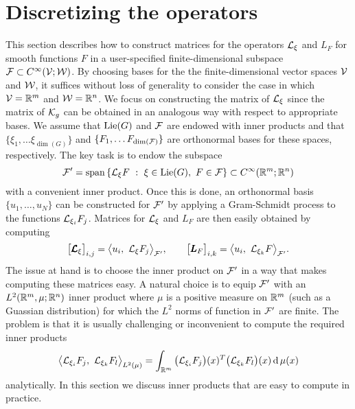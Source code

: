 \documentclass[twoside,11pt]{article}
\begin{document}
\section{Discretizing the operators}
\label{sec:discretization}
This section describes how to construct matrices for the operators ${\mathcal{L}}_\xi$ and $L_F$ for smooth functions $F$ in a user-specified finite-dimensional subspace ${\mathcal{F}} \subset C^{\infty}({\mathcal{V}};{\mathcal{W}})$.
By choosing bases for the the finite-dimensional vector spaces ${\mathcal{V}}$ and ${\mathcal{W}}$, it suffices without loss of generality to consider the case in which ${\mathcal{V}} = \mathbb{R}^m$ and ${\mathcal{W}} = \mathbb{R}^n$.
We focus on constructing the matrix of ${\mathcal{L}}_\xi$ since the matrix of ${\mathcal{K}}_g$ can be obtained in an analogous way with respect to appropriate bases.
We assume that $\operatorname{Lie}(G)$ and ${\mathcal{F}}$ are endowed with inner products and that $\{ \xi_1, \ldots \xi_{\dim(G)} \}$ and $\{ F_1, \ldots F_{\dim({\mathcal{F}})} \}$ are orthonormal bases for these spaces, respectively.
The key task is to endow the subspace
\begin{equation}
    {\mathcal{F}}' = \operatorname{span} \left\{ {\mathcal{L}}_\xi F \ : \ \xi\in\operatorname{Lie}(G),\ F\in{\mathcal{F}} \right\} \subset C^{\infty}(\mathbb{R}^m;\mathbb{R}^n)
\end{equation}
with a convenient inner product.
Once this is done, an orthonormal basis $\{ u_1, \ldots, u_N \}$ can be constructed for ${\mathcal{F}}'$ by applying a Gram-Schmidt process to the functions ${\mathcal{L}}_{\xi_i} F_j$.
Matrices for ${\mathcal{L}}_\xi$ and $L_F$ are then easily obtained by computing
\begin{equation}
    \big[ {\pmb{{\mathcal{L}}}}_\xi \big]_{i,j} = \big\langle u_i, \ {\mathcal{L}}_\xi F_j \big\rangle_{{\mathcal{F}}'}, \qquad
    \big[ {\pmb{L}}_F \big]_{i,k} = \big\langle u_i, \ {\mathcal{L}}_{\xi_k} F \big\rangle_{{\mathcal{F}}'}.
\end{equation}
The issue at hand is to choose the inner product on ${\mathcal{F}}'$ in a way that makes computing these matrices easy.
A natural choice is to equip ${\mathcal{F}}'$ with an $L^2(\mathbb{R}^m, \mu; \mathbb{R}^n)$ inner product where $\mu$ is a positive measure on $\mathbb{R}^m$ (such as a Guassian distribution) for which the $L^2$ norms of function in ${\mathcal{F}}'$ are finite.
The problem is that it is usually challenging or inconvenient to compute the required inner products
\begin{equation}
    \big\langle \mcal{L}_{\xi_i} F_j,\ \mcal{L}_{\xi_k} F_l \big\rangle_{L^2(\mu)} = \int_{\R^m} \big(\mcal{L}_{\xi_i} F_j\big)(x)^T \big(\mcal{L}_{\xi_k} F_l\big)(x) \td\mu(x)
    \label{eqn:L2_mu_inner_prod_of_Lie_derivs}
\end{equation}
analytically.
In this section we discuss inner products that are easy to compute in practice.
\end{document}
